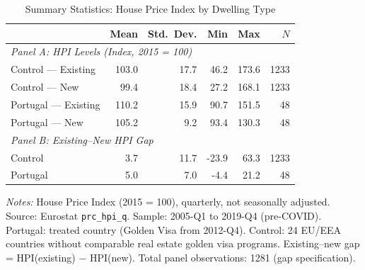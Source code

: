 \begin{table}[H]
\centering
\caption{Summary Statistics: House Price Index by Dwelling Type}
\label{tab:summary}
\begin{threeparttable}
\begin{tabular}{lrrrrr}
\toprule
 & Mean & Std.\ Dev. & Min & Max & $N$ \\
\midrule
\multicolumn{6}{l}{\textit{Panel A: HPI Levels (Index, 2015 = 100)}} \\
\quad Control --- Existing & 103.0 & 17.7 & 46.2 & 173.6 & 1233 \\
\quad Control --- New & 99.4 & 18.4 & 27.2 & 168.1 & 1233 \\
\quad Portugal --- Existing & 110.2 & 15.9 & 90.7 & 151.5 & 48 \\
\quad Portugal --- New & 105.2 & 9.2 & 93.4 & 130.3 & 48 \\
\midrule
\multicolumn{6}{l}{\textit{Panel B: Existing--New HPI Gap}} \\
\quad Control & 3.7 & 11.7 & -23.9 & 63.3 & 1233 \\
\quad Portugal & 5.0 & 7.0 & -4.4 & 21.2 & 48 \\
\bottomrule
\end{tabular}
\begin{tablenotes}[flushleft]
\small
\item \textit{Notes:} House Price Index (2015 = 100), quarterly, not seasonally adjusted. Source: Eurostat \texttt{prc\_hpi\_q}. Sample: 2005-Q1 to 2019-Q4 (pre-COVID). Portugal: treated country (Golden Visa from 2012-Q4). Control: 24 EU/EEA countries without comparable real estate golden visa programs. Existing--new gap = HPI(existing) $-$ HPI(new). Total panel observations: 1281 (gap specification).
\end{tablenotes}
\end{threeparttable}
\end{table}

